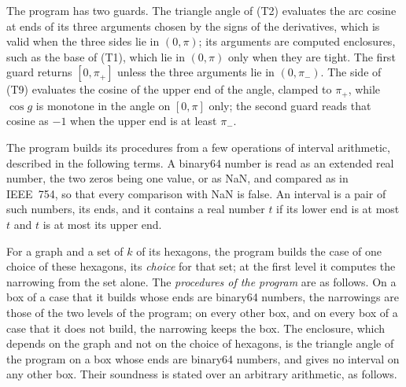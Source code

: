 \documentclass[12pt]{amsart}
\theoremstyle{definition}
\theoremstyle{plain}
\theoremstyle{definition}
\begin{document}
The program has two guards. The triangle angle of (T2) evaluates the arc cosine at ends of its three arguments chosen by the signs of the derivatives, which is valid when the three sides lie in $(0,\pi)$; its arguments are computed enclosures, such as the base of (T1), which lie in $(0,\pi)$ only when they are tight. The first guard returns $[0,\pi_+]$ unless the three arguments lie in $(0,\pi_-)$. The side of (T9) evaluates the cosine of the upper end of the angle, clamped to $\pi_+$, while $\cos g$ is monotone in the angle on $[0,\pi]$ only; the second guard reads that cosine as $-1$ when the upper end is at least $\pi_-$.

The program builds its procedures from a few operations of interval arithmetic, described in the following terms. A binary64 number is read as an extended real number, the two zeros being one value, or as NaN, and compared as in IEEE~754, so that every comparison with NaN is false. An interval is a pair of such numbers, its ends, and it contains a real number $t$ if its lower end is at most $t$ and $t$ is at most its upper end.

For a graph and a set of $k$ of its hexagons, the program builds the case of one choice of these hexagons, its \emph{choice} for that set; at the first level it computes the narrowing from the set alone. The \emph{procedures of the program} are as follows. On a box of a case that it builds whose ends are binary64 numbers, the narrowings are those of the two levels of the program; on every other box, and on every box of a case that it does not build, the narrowing keeps the box. The enclosure, which depends on the graph and not on the choice of hexagons, is the triangle angle of the program on a box whose ends are binary64 numbers, and gives no interval on any other box. Their soundness is stated over an arbitrary arithmetic, as follows.
\end{document}
